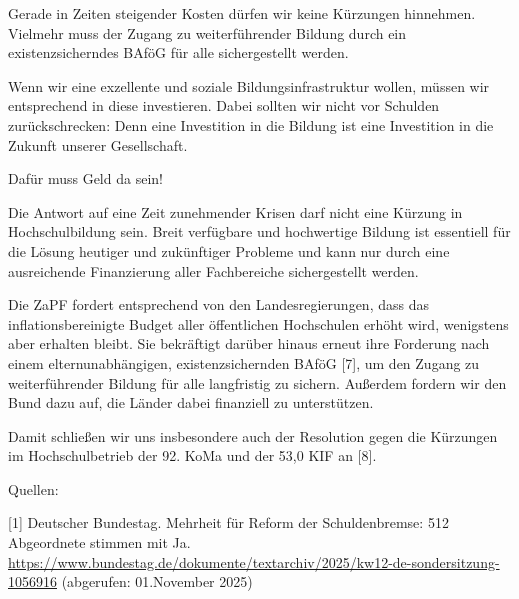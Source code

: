 \documentclass[DIV=calc]{scrartcl}
\let\oldgrqq=\grqq
\def\grqq{\oldgrqq\xspace}
\begin{document}
Gerade in Zeiten steigender Kosten dürfen wir keine Kürzungen hinnehmen. Vielmehr muss der Zugang zu weiterführender Bildung durch ein existenzsicherndes BAföG für alle sichergestellt werden.

Wenn wir eine exzellente und soziale Bildungsinfrastruktur wollen, müssen wir entsprechend in diese investieren. Dabei sollten wir nicht vor Schulden zurückschrecken: Denn eine Investition in die Bildung ist eine Investition in die Zukunft unserer Gesellschaft.

Dafür muss Geld da sein!

Die Antwort auf eine Zeit zunehmender Krisen darf nicht eine Kürzung in Hochschulbildung sein. Breit verfügbare und hochwertige Bildung ist essentiell für die Lösung heutiger und zukünftiger Probleme und kann nur durch eine ausreichende Finanzierung aller Fachbereiche sichergestellt werden.

Die ZaPF fordert entsprechend von den Landesregierungen, dass das inflationsbereinigte Budget aller öffentlichen Hochschulen erhöht wird, wenigstens aber erhalten bleibt. Sie bekräftigt darüber hinaus erneut ihre Forderung nach einem elternunabhängigen, existenzsichernden BAföG [7], um den Zugang zu weiterführender Bildung für alle langfristig zu sichern. Außerdem fordern wir den Bund dazu auf, die Länder dabei finanziell zu unterstützen.

Damit schließen wir uns insbesondere auch der Resolution gegen die Kürzungen im Hochschulbetrieb der 92. KoMa und der 53,0 KIF an [8].

Quellen:

[1] Deutscher Bundestag. \glqq Mehrheit für Reform der Schuldenbremse: 512 Abgeordnete stimmen mit Ja. \grqq  \url{https://www.bundestag.de/dokumente/textarchiv/2025/kw12-de-sondersitzung-1056916} (abgerufen: 01.November 2025)
\end{document}
